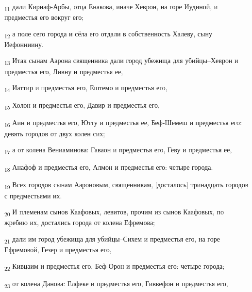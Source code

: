 \begin{tcolorbox}
\textsubscript{11} дали Кириаф-Арбы, отца Енакова, иначе Хеврон, на горе Иудиной, и предместья его вокруг его;
\end{tcolorbox}
\begin{tcolorbox}
\textsubscript{12} а поле сего города и сёла его отдали в собственность Халеву, сыну Иефонниину.
\end{tcolorbox}
\begin{tcolorbox}
\textsubscript{13} Итак сынам Аарона священника дали город убежища для убийцы--Хеврон и предместья его, Ливну и предместья ее,
\end{tcolorbox}
\begin{tcolorbox}
\textsubscript{14} Иаттир и предместья его, Ештемо и предместья его,
\end{tcolorbox}
\begin{tcolorbox}
\textsubscript{15} Холон и предместья его, Давир и предместья его,
\end{tcolorbox}
\begin{tcolorbox}
\textsubscript{16} Аин и предместья его, Ютту и предместья ее, Беф-Шемеш и предместья его: девять городов от двух колен сих;
\end{tcolorbox}
\begin{tcolorbox}
\textsubscript{17} а от колена Вениаминова: Гаваон и предместья его, Геву и предместья ее,
\end{tcolorbox}
\begin{tcolorbox}
\textsubscript{18} Анафоф и предместья его, Алмон и предместья его: четыре города.
\end{tcolorbox}
\begin{tcolorbox}
\textsubscript{19} Всех городов сынам Аароновым, священникам, [досталось] тринадцать городов с предместьями их.
\end{tcolorbox}
\begin{tcolorbox}
\textsubscript{20} И племенам сынов Каафовых, левитов, прочим из сынов Каафовых, по жребию их, достались города от колена Ефремова;
\end{tcolorbox}
\begin{tcolorbox}
\textsubscript{21} дали им город убежища для убийцы--Сихем и предместья его, на горе Ефремовой, Гезер и предместья его,
\end{tcolorbox}
\begin{tcolorbox}
\textsubscript{22} Кивцаим и предместья его, Беф-Орон и предместья его: четыре города;
\end{tcolorbox}
\begin{tcolorbox}
\textsubscript{23} от колена Данова: Елфеке и предместья его, Гиввефон и предместья его,
\end{tcolorbox}
